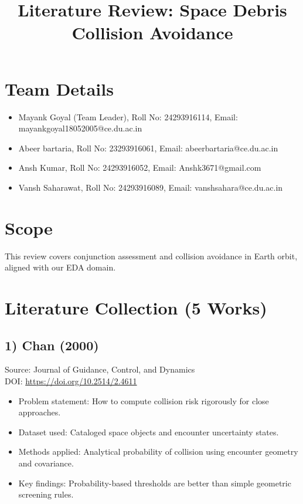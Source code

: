 \documentclass[11pt]{article}
\title{Literature Review: Space Debris Collision Avoidance}
\author{}
\date{}
\begin{document}
\maketitle

\section*{Team Details}
\begin{itemize}
\item Mayank Goyal (Team Leader), Roll No: 24293916114, Email: mayankgoyal18052005@ce.du.ac.in
\item Abeer bartaria, Roll No: 23293916061, Email: abeerbartaria@ce.du.ac.in
\item Ansh Kumar, Roll No: 24293916052, Email: Anshk3671@gmail.com
\item Vansh Saharawat, Roll No: 24293916089, Email: vanshsahara@ce.du.ac.in
\end{itemize}

\section*{Scope}
This review covers conjunction assessment and collision avoidance in Earth orbit, aligned with our EDA domain.

\section*{Literature Collection (5 Works)}

\subsection*{1) Chan (2000)}
Source: Journal of Guidance, Control, and Dynamics\\
DOI: \url{https://doi.org/10.2514/2.4611}
\begin{itemize}
\item Problem statement: How to compute collision risk rigorously for close approaches.
\item Dataset used: Cataloged space objects and encounter uncertainty states.
\item Methods applied: Analytical probability of collision using encounter geometry and covariance.
\item Key findings: Probability-based thresholds are better than simple geometric screening rules.
\end{itemize}
\end{document}
